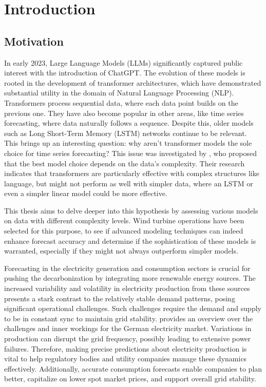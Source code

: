 \documentclass{article}
\begin{document}
\newpage

\tableofcontents
\thispagestyle{empty}

\newpage

\section{Introduction}

\subsection{Motivation}

In early 2023, Large Language Models (LLMs) significantly captured public interest with the introduction of ChatGPT. The evolution of these models is rooted in the development of transformer architectures, which have demonstrated substantial utility in the domain of Natural Language Processing (NLP). Transformers process sequential data, where each data point builds on the previous one. They have also become popular in other areas, like time series forecasting, where data naturally follows a sequence. Despite this, older models such as Long Short-Term Memory (LSTM) networks continue to be relevant. This brings up an interesting question: why aren't transformer models the sole choice for time series forecasting? This issue was investigated by \cite{transformers-effectiveness}, who proposed that the best model choice depends on the data's complexity. Their research indicates that transformers are particularly effective with complex structures like language, but might not perform as well with simpler data, where an LSTM or even a simpler linear model could be more effective. \par
This thesis aims to delve deeper into this hypothesis by assessing various models on data with different complexity levels. Wind turbine operations have been selected for this purpose, to see if advanced modeling techniques can indeed enhance forecast accuracy and determine if the sophistication of these models is warranted, especially if they might not always outperform simpler models. \par

Forecasting in the electricity generation and consumption sectors is crucial for pushing the decarbonization by integrating more renewable energy sources. The increased variability and volatility in electricity production from these sources presents a stark contrast to the relatively stable demand patterns, posing significant operational challenges. Such challenges require the demand and supply to be in constant sync to maintain grid stability. \cite{stability_grid} provides an overview over the challenges and inner workings for the German electricity market. Variations in production can disrupt the grid frequency, possibly leading to extensive power failures. Therefore, making precise predictions about electricity production is vital to help regulatory bodies and utility companies manage these dynamics effectively. Additionally, accurate consumption forecasts enable companies to plan better, capitalize on lower spot market prices, and support overall grid stability. \par
\end{document}
